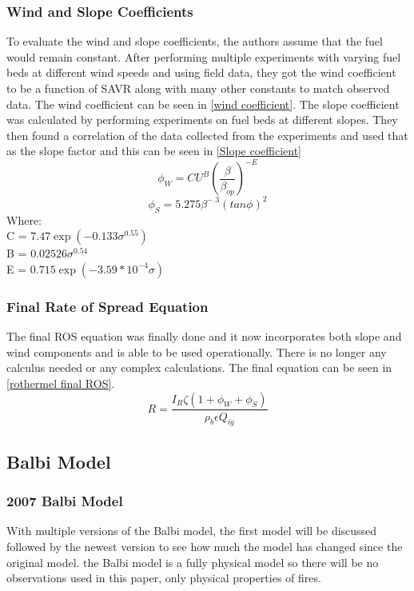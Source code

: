 \documentclass{article}
\begin{document}
\subsubsection{Wind and Slope Coefficients}
\indent To evaluate the wind and slope coefficients, the authors assume that the fuel would remain constant. After performing multiple experiments with varying fuel beds at different wind speeds and using field data, they got the wind coefficient to be a function of SAVR along with many other constants to match observed data. The wind coefficient can be seen in \ref{wind coefficient}. The slope coefficient was calculated by performing experiments on fuel beds at different slopes. They then found a correlation of the data collected from the experiments and used that as the slope factor and this can be seen in \ref{Slope coefficient}
\begin{equation}
	\label{wind coefficient}
	\phi _ W = C U^{B} (\frac {\beta} {\beta_{op}}) ^ {-E}
\end{equation}
\begin{equation}
	\label{Slope coefficient}
	\phi _ S = 5.275 \beta ^ {-.3} (tan \phi)^{2}
\end{equation}
Where: \\
C = $7.47 \exp(-0.133 \sigma^{0.55})$ \\
B = $0.02526 \sigma^{0.54}$\\
E = $0.715 \exp(-3.59 * 10^{-4} \sigma)$\\
\subsubsection{Final Rate of Spread Equation}
\indent The final ROS equation was finally done and it now incorporates both slope and wind components and is able to be used operationally. There is no longer any calculus needed or any complex calculations. The final equation can be seen in \ref{rothermel final ROS}. 
\begin{equation}
	\label{rothermel final ROS}
	R = \frac {I_R \zeta (1 + \phi _ W + \phi _ S )} {\rho _ b \epsilon Q_{ig}}
\end{equation}
\subsection{Balbi Model}
\subsubsection*{2007 Balbi Model}
\indent With multiple versions of the Balbi model, the first model will be discussed followed by the newest version to see how much the model has changed since the original model. the Balbi model is a fully physical model so there will be no observations used in this paper, only physical properties of fires.
\end{document}
